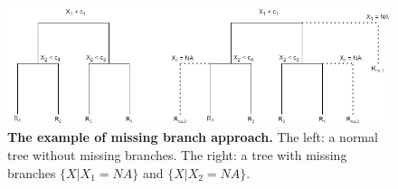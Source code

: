 \begin{figure}[ht]
\begin{center}
\includegraphics[scale=0.5]{./images/missing_branch_example}
\caption{{\bf The example of missing branch approach.} The left: a normal tree without missing branches. The right: a tree with missing branches $\{ X|X_1 = NA \}$ and $\{ X|X_2 = NA \}$.\setlength{\baselineskip}{1.25em}}
\label{fig_missing_branch_example}
\end{center}
\end{figure}